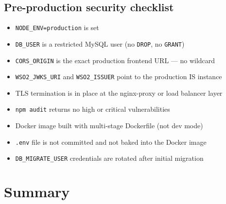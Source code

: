 \documentclass[11pt]{article}
\begin{document}
\subsection{Pre-production security checklist}

\begin{itemize}
  \item[$\square$] \texttt{NODE\_ENV=production} is set
  \item[$\square$] \texttt{DB\_USER} is a restricted MySQL user (no \texttt{DROP}, no \texttt{GRANT})
  \item[$\square$] \texttt{CORS\_ORIGIN} is the exact production frontend URL --- no wildcard
  \item[$\square$] \texttt{WSO2\_JWKS\_URI} and \texttt{WSO2\_ISSUER} point to the production IS instance
  \item[$\square$] TLS termination is in place at the nginx-proxy or load balancer layer
  \item[$\square$] \texttt{npm audit} returns no high or critical vulnerabilities
  \item[$\square$] Docker image built with multi-stage Dockerfile (not dev mode)
  \item[$\square$] \texttt{.env} file is not committed and not baked into the Docker image
  \item[$\square$] \texttt{DB\_MIGRATE\_USER} credentials are rotated after initial migration
\end{itemize}

\section{Summary}
\end{document}
